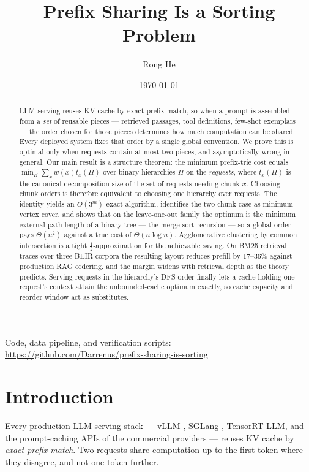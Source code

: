 \documentclass[11pt]{article}
\title{\bf Prefix Sharing Is a Sorting Problem}
\author{Rong He}
\date{\today}
\theoremstyle{plain}
\begin{document}
\maketitle
\begin{center}\small
Code, data pipeline, and verification scripts:\\
\url{https://github.com/Darrenus/prefix-sharing-is-sorting}
\end{center}
\begin{abstract}
LLM serving reuses KV cache by exact prefix match, so when a prompt is assembled from a \emph{set} of reusable pieces --- retrieved passages, tool definitions, few-shot exemplars --- the order chosen for those pieces determines how much computation can be shared. Every deployed system fixes that order by a single global convention. We prove this is optimal only when requests contain at most two pieces, and asymptotically wrong in general. Our main result is a structure theorem: the minimum prefix-trie cost equals $\min_H \sum_x w(x) t_x(H)$ over binary hierarchies $H$ on the \emph{requests}, where $t_x(H)$ is the canonical decomposition size of the set of requests needing chunk $x$. Choosing chunk orders is therefore equivalent to choosing one hierarchy over requests. The identity yields an $O(3^m)$ exact algorithm, identifies the two-chunk case as minimum vertex cover, and shows that on the leave-one-out family the optimum is the minimum external path length of a binary tree --- the merge-sort recursion --- so a global order pays $\Theta(n^2)$ against a true cost of $\Theta(n\log n)$. Agglomerative clustering by common intersection is a tight $\tfrac12$-approximation for the achievable saving. On BM25 retrieval traces over three BEIR corpora the resulting layout reduces prefill by 17--36\% against production RAG ordering, and the margin widens with retrieval depth as the theory predicts. Serving requests in the hierarchy's DFS order finally lets a cache holding one request's context attain the unbounded-cache optimum exactly, so cache capacity and reorder window act as substitutes.
\end{abstract}
\section{Introduction}

Every production LLM serving stack --- vLLM \cite{KWO23}, SGLang \cite{SGL}, TensorRT-LLM, and the prompt-caching APIs of the commercial providers --- reuses KV cache by \emph{exact prefix match}. Two requests share computation up to the first token where they disagree, and not one token further.
\end{document}
